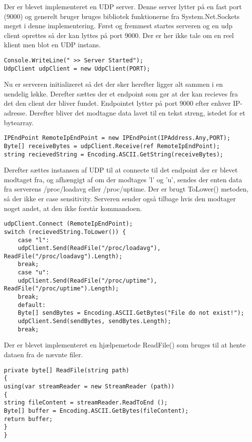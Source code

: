 Der er blevet implementeret en UDP server. Denne server lytter på en fast port (9000) og generelt bruger bruges bibliotek funktionerne fra System.Net.Sockets meget i denne implementering. Først og fremmest startes serveren og en udp client oprettes så der kan lyttes på port 9000. Der er her ikke tale om en reel klient men blot en UDP instans.

\begin{verbatim}
Console.WriteLine(" >> Server Started");
UdpClient udpClient = new UdpClient(PORT);
\end{verbatim}

\noindent Nu er serveren initializeret så det der sker herefter ligger alt sammen i en uendelig løkke. Derefter sættes der et endpoint som gør at der kan recieves fra det den client der bliver fundet. Endpointet lytter på port 9000 efter enhver IP-adresse. Derefter bliver det modtagne data lavet til en tekst streng, istedet for et bytearray.  

\begin{verbatim}
IPEndPoint RemoteIpEndPoint = new IPEndPoint(IPAddress.Any,PORT);
Byte[] receiveBytes = udpClient.Receive(ref RemoteIpEndPoint);
string recievedString = Encoding.ASCII.GetString(receiveBytes);
\end{verbatim}

\noindent Derefter sættes instansen af UDP til at connecte til det endpoint der er blevet modtaget fra, og afhængigt af om der modtages 'l' og 'u', sendes der enten data fra serverens /proc/loadavg eller /proc/uptime. Der er brugt ToLower() metoden, så der ikke er case sensitivity. Serveren sender også tilbage hvis den modtager noget andet, at den ikke forstår kommandoen.

\begin{verbatim}
udpClient.Connect (RemoteIpEndPoint);
switch (recievedString.ToLower()) {
	case "l":
	udpClient.Send(ReadFile("/proc/loadavg"), ReadFile("/proc/loadavg").Length);
	break;
	case "u":
	udpClient.Send(ReadFile("/proc/uptime"), ReadFile("/proc/uptime").Length);
	break;
	default:
	Byte[] sendBytes = Encoding.ASCII.GetBytes("File do not exist!");
	udpClient.Send(sendBytes, sendBytes.Length);
	break;
\end{verbatim}

\noindent Der er blevet implementeret en hjælpemetode ReadFile() som bruges til at hente dataen fra de nævnte filer.

\begin{verbatim}
private byte[] ReadFile(string path)
{
using(var streamReader = new StreamReader (path))
{
string fileContent = streamReader.ReadToEnd ();
Byte[] buffer = Encoding.ASCII.GetBytes(fileContent);
return buffer;
}
}
\end{verbatim}

